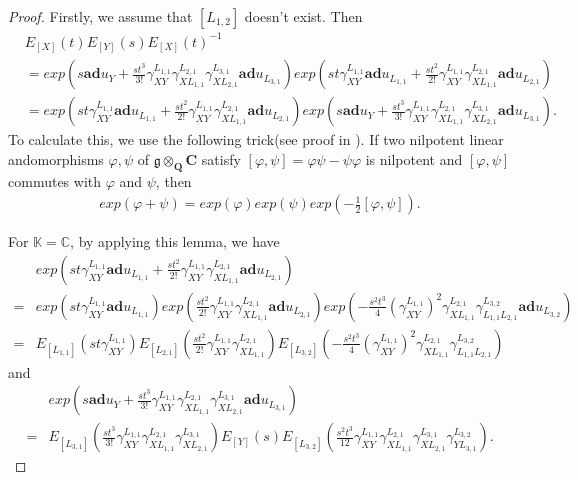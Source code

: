 \documentclass[12pt]{amsart}
\begin{document}
\begin{proof}
Firstly, we assume that $[L_{1,2}]$ doesn't exist. Then 
\begin{align*}
       & E_{[X]}(t) E_{[Y]}(s) E_{[X]}(t)^{-1} \\
       &= exp(  s\mathbf{ad}u_Y + \frac{st^3}{3!}\gamma_{XY}^{L_{1,1}}\gamma_{XL_{1,1}}^{L_{2,1}}\gamma_{XL_{2,1}}^{L_{3,1}}\mathbf{ad}u_{L_{3,1}}    ) exp(st\gamma_{XY}^{L_{1,1}}\mathbf{ad}u_{L_{1,1}} +  \frac{st^2}{2!}\gamma_{XY}^{L_{1,1}}\gamma_{XL_{1,1}}^{L_{2,1}}\mathbf{ad}u_{L_{2,1}})  \\
       &= exp(st\gamma_{XY}^{L_{1,1}}\mathbf{ad}u_{L_{1,1}} +  \frac{st^2}{2!}\gamma_{XY}^{L_{1,1}}\gamma_{XL_{1,1}}^{L_{2,1}}\mathbf{ad}u_{L_{2,1}})  exp(  s\mathbf{ad}u_Y + \frac{st^3}{3!}\gamma_{XY}^{L_{1,1}}\gamma_{XL_{1,1}}^{L_{2,1}}\gamma_{XL_{2,1}}^{L_{3,1}}\mathbf{ad}u_{L_{3,1}}    ) .
    \end{align*}
    To calculate this, we use the following trick(see proof in \cite[Lemma 5.1.2]{carter}). 
    If two nilpotent linear andomorphisms $\varphi,\psi $ of $\mathfrak{g}\otimes_{\mathbf{Q}} \mathbf{C}$ satisfy $[\varphi,\psi]=\varphi\psi-\psi\varphi$ is nilpotent and $[\varphi,\psi]$ commutes with $\varphi$ and $\psi$, then 
    \begin{align*}
        exp(\varphi + \psi) = exp(\varphi) exp(\psi) exp(-\frac{1}{2}[\varphi,\psi]).
    \end{align*}
    
    For $\mathbb{K} = \mathbb{C}$, by applying this lemma, we have 
    \begin{align*}
        &exp(st\gamma_{XY}^{L_{1,1}}\mathbf{ad}u_{L_{1,1}} +  \frac{st^2}{2!}\gamma_{XY}^{L_{1,1}}\gamma_{XL_{1,1}}^{L_{2,1}}\mathbf{ad}u_{L_{2,1}})  \\
    =   &exp(st\gamma_{XY}^{L_{1,1}}\mathbf{ad}u_{L_{1,1}})  exp( \frac{st^2}{2!}\gamma_{XY}^{L_{1,1}}\gamma_{XL_{1,1}}^{L_{2,1}}\mathbf{ad}u_{L_{2,1}}) exp(-\frac{s^2 t^3}{4} (\gamma_{XY}^{L_{1,1}})^2 \gamma_{XL_{1,1}}^{L_{2,1}} \gamma_{L_{1,1}L_{2,1}}^{L_{3,2}} \mathbf{ad} u_{L_{3,2}}) \\
    =   &E_{[L_{1,1}]}(st\gamma_{XY}^{L_{1,1}}) E_{[L_{2,1}]}(\frac{st^2}{2!}\gamma_{XY}^{L_{1,1}}\gamma_{XL_{1,1}}^{L_{2,1}}) E_{[L_{3,2}]}(-\frac{s^2 t^3}{4} (\gamma_{XY}^{L_{1,1}})^2 \gamma_{XL_{1,1}}^{L_{2,1}} \gamma_{L_{1,1}L_{2,1}}^{L_{3,2}})
    \end{align*}
   and
   \begin{align*}
     &  exp(  s\mathbf{ad}u_Y + \frac{st^3}{3!}\gamma_{XY}^{L_{1,1}}\gamma_{XL_{1,1}}^{L_{2,1}}\gamma_{XL_{2,1}}^{L_{3,1}}\mathbf{ad}u_{L_{3,1}}  )\\
    =&  E_{[L_{3,1}]}( \frac{st^3}{3!}\gamma_{XY}^{L_{1,1}}\gamma_{XL_{1,1}}^{L_{2,1}}\gamma_{XL_{2,1}}^{L_{3,1}})   E_{[Y]}(s)  E_{[L_{3,2}]}(\frac{s^2 t^3}{12} \gamma_{XY}^{L_{1,1}} \gamma_{XL_{1,1}}^{L_{2,1}} \gamma_{XL_{2,1}}^{L_{3,1}} \gamma_{YL_{3,1}}^{L_{3,2}}    ).
   \end{align*}


\end{proof}
\end{document}
